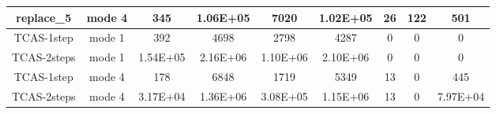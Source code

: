 \begin{table}[]
\begin{tabular}{@{}ccccccccc@{}}
        replace\_5                                                  & mode 4                                                       & 345                                                        & 1.06E+05                                                     & 7020                                                           & 1.02E+05                                                               & 26                                                            & 122                                                                    & 501      \\ \midrule \midrule
        TCAS-1step                                                  & mode 1                                                       & 392                                                        & 4698                                                         & 2798                                                           & 4287                                                                   & 0                                                             & 0                                                                      & 0        \\ \midrule
        TCAS-2steps                                                 & mode 1                                                       & 1.54E+05                                                   & 2.16E+06                                                     & 1.10E+06                                                       & 2.10E+06                                                               & 0                                                             & 0                                                                      & 0        \\ \midrule
        TCAS-1step                                                  & mode 4                                                       & 178                                                        & 6848                                                         & 1719                                                           & 5349                                                                   & 13                                                            & 0                                                                      & 445      \\ \midrule
        TCAS-2steps                                                 & mode 4                                                       & 3.17E+04                                                   & 1.36E+06                                                     & 3.08E+05                                                       & 1.15E+06                                                               & 13                                                            & 0                                                                      & 7.97E+04 \\ \midrule

\end{tabular}
\end{table}

